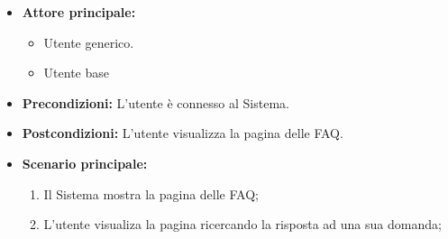 \label{usecase:Visualizzazione FAQ}
\begin{itemize}
	\item \textbf{Attore principale:} 
    \begin{itemize}
        \item Utente generico.
        \item Utente base
    \end{itemize}

	\item \textbf{Precondizioni:}
	      L'utente è connesso al Sistema.

	\item \textbf{Postcondizioni:} L'utente visualizza la pagina delle FAQ.

	\item \textbf{Scenario principale:}
	      \begin{enumerate}
              \item Il Sistema mostra la pagina delle FAQ;
              \item L'utente visualiza la pagina ricercando la risposta ad una sua domanda;
		    
	      \end{enumerate}
\end{itemize}